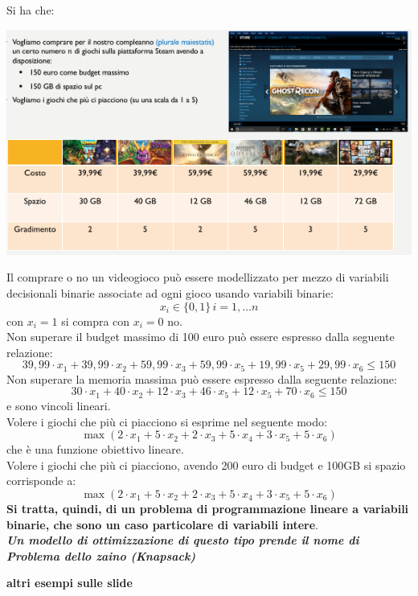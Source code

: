 \message{ !name(ro.tex)}\documentclass[a4paper,12pt, oneside]{book}
\begin{document}
\begin{esempio}
  Si ha che:
  \begin{center}
    \includegraphics[scale = 0.7]{img/steam.png}
  \end{center}
  Il comprare o no un videogioco può essere modellizzato per mezzo
  di variabili decisionali binarie associate ad ogni gioco usando
  variabili binarie:
  \[x_i\in\{0,1\}\,i=1,\ldots n\]
  con $x_i=1$ si compra con $x_i=0$ no.\\
  Non superare il budget massimo di 100 euro può essere espresso
  dalla seguente relazione:
  \[39,99 \cdot x_1 + 39,99 \cdot x_2 + 59,99 \cdot x_3 + 59,99 \cdot
    x_5 + 19,99 \cdot x_5+ 29,99 \cdot x_6 ≤ 150\]
  Non superare la memoria massima può essere espresso dalla seguente
  relazione:
  \[30 \cdot x_1 + 40 \cdot x_2 + 12 \cdot x_3 + 46 \cdot
    x_5 + 12 \cdot x_5+ 70 \cdot x_6 ≤ 150\]
  e sono vincoli lineari.\\
  Volere i giochi che più ci piacciono si esprime nel seguente modo:
  \[\max(2\cdot x_1+5\cdot x_2+2\cdot x_3+5\cdot x_4+3\cdot x_5+5\cdot x_6)\]
  che è una funzione obiettivo lineare.\\
  Volere i giochi che più ci piacciono, avendo 200 euro di budget e
  100GB si spazio corrisponde a:
  \[\max(2\cdot x_1+5\cdot x_2+2\cdot x_3+5\cdot x_4+3\cdot x_5+5\cdot x_6)\]
  \textbf{Si tratta, quindi, di un problema di programmazione lineare a
    variabili binarie, che sono un caso particolare di variabili
    intere}.\\
  \textbf{\textit{Un modello di ottimizzazione di questo tipo prende
      il nome di Problema dello zaino (Knapsack)}}
\end{esempio}
\textbf{altri esempi sulle slide}
\end{document}
